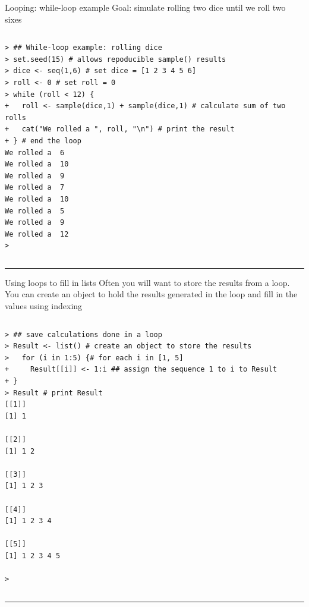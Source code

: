 \documentclass[table,smaller]{beamer}
\begin{document}
\begin{frame}[fragile,label=sec-10-3]{Looping: while-loop example}
 Goal: simulate rolling two dice until we roll two sixes

\vspace{-.5em}
\begin{columns}
\begin{block}{}
\begin{verbatim}
> ## While-loop example: rolling dice
> set.seed(15) # allows repoducible sample() results
> dice <- seq(1,6) # set dice = [1 2 3 4 5 6]
> roll <- 0 # set roll = 0
> while (roll < 12) {
+   roll <- sample(dice,1) + sample(dice,1) # calculate sum of two rolls
+   cat("We rolled a ", roll, "\n") # print the result
+ } # end the loop 
We rolled a  6 
We rolled a  10 
We rolled a  9 
We rolled a  7 
We rolled a  10 
We rolled a  5 
We rolled a  9 
We rolled a  12 
>
\end{verbatim}
\end{block}
\end{columns}
\vspace{.5em}

\rule{\linewidth}{0.5pt}
\end{frame}
\begin{frame}[fragile,label=sec-10-4]{Using loops to fill in lists}
 Often you will want to store the results from a loop. You can create an object to hold the results generated in the loop and fill in the values using indexing

\vspace{-.5em}
\begin{columns}
\begin{block}{}
\begin{verbatim}
> ## save calculations done in a loop
> Result <- list() # create an object to store the results
>   for (i in 1:5) {# for each i in [1, 5]
+     Result[[i]] <- 1:i ## assign the sequence 1 to i to Result
+ }
> Result # print Result
[[1]]
[1] 1

[[2]]
[1] 1 2

[[3]]
[1] 1 2 3

[[4]]
[1] 1 2 3 4

[[5]]
[1] 1 2 3 4 5

>
\end{verbatim}
\end{block}
\end{columns}
\vspace{.5em}

\rule{\linewidth}{0.5pt}
\end{frame}
\end{document}
